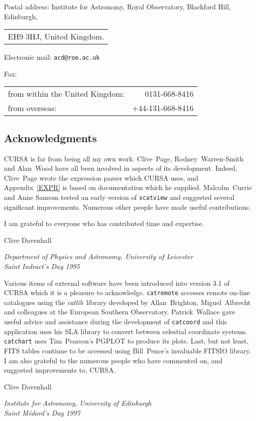\documentclass[twoside,11pt]{article}
\renewcommand{\_}{\texttt{\symbol{95}}}
\begin{document}
\vspace{3mm}

Postal address: Institute for Astronomy, Royal Observatory, Blackford Hill,
Edinburgh, \\
\begin{tabular}{l}
EH9 3HJ, United Kingdom.  \\
\end{tabular}

\vspace{4mm}

Electronic mail: {\tt acd@roe.ac.uk}

\vspace{4mm}

Fax: \\
\begin{tabular}{lr}
from within the United Kingdom: &    0131-668-8416 \\
from overseas:                  & +44-131-668-8416 \\
\end{tabular}


\newpage
\subsection*{Acknowledgments}

CURSA is far from being all my own work. Clive~Page, Rodney~Warren-Smith
and Alan~Wood have all been involved in aspects of its development.
Indeed, Clive~Page wrote the expression parser which CURSA uses, and
Appendix~\ref{EXPR} is based on documentation which he supplied.
Malcolm~Currie and Anne Sansom tested an early version of {\tt xcatview}
and suggested several significant improvements. Numerous other people have
made useful contributions.

I am grateful to everyone who has contributed time and expertise.
\begin{flushright}
Clive Davenhall \\
\raggedright {\it Department of Physics and Astronomy, University of
Leicester \\
Saint Indract's Day 1995}
\end{flushright}

Various items of external software have been introduced into version 3.1
of CURSA which it is a pleasure to acknowledge.  {\tt catremote} accesses
remote on-line catalogues using the {\it catlib}\, library developed by
Allan~Brighton,  Miguel~Albrecht and colleagues at the European Southern
Observatory.  Patrick~Wallace gave useful advice and assistance during the
development of {\tt catcoord} and this application uses his SLA library to
convert between celestial coordinate systems.  {\tt catchart} uses
Tim~Pearson's PGPLOT to produce its plots.  Last, but not least, FITS
tables continue to be accessed using Bill~Pence's invaluable FITSIO library.
I am also grateful to the numerous people who have commented on, and
suggested improvements to, CURSA.
\begin{flushright}
Clive Davenhall \\
\raggedright {\it Institute for Astronomy, University of Edinburgh \\
Saint M\'{e}dard's Day 1997}
\end{flushright}
\end{document}
